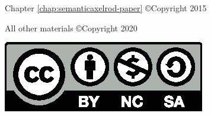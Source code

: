\begin{titlingpage}
\mbox{}

\begin{center}

{\large Chapter \ref{chap:semanticaxelrod-paper} \copyright Copyright 2015 \par}

{\large All other materials \copyright Copyright 2020 \par}

 {\large \thesisAuthor\par}%
 
 \vskip 1cm

\includegraphics[scale=0.5]{graphics/by-nc-sa.eps}



\end{center}
 \vfill
\end{titlingpage}
